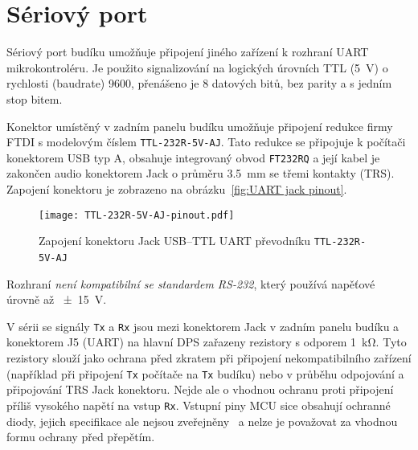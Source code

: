 \section{Sériový port}
Sériový port budíku umožňuje připojení jiného zařízení k rozhraní \acs{UART}
mikrokontroléru. Je použito signalizování na logických úrovních \acs{TTL}
(\SI{5}{\volt}) o rychlosti (\foreignlanguage{english}{baudrate})
\SI{9600}{\baud}, přenášeno je \num{8} datových bitů, bez parity a s jedním
stop bitem.

Konektor umístěný v zadním panelu budíku umožňuje připojení redukce firmy FTDI
s modelovým číslem \texttt{TTL-232R-5V-AJ}. Tato redukce se připojuje
k počítači konektorem USB typ A, obsahuje integrovaný obvod \texttt{FT232RQ}
a její kabel je zakončen audio konektorem Jack o průměru \SI{3,5}{\milli\meter}
se třemi kontakty (TRS). Zapojení konektoru je zobrazeno na
obrázku~\vref{fig:UART jack pinout}.

\begin{figure}[htbp]
    \centering
    \texttt{[image: TTL-232R-5V-AJ-pinout.pdf]}
    \caption{%
        Zapojení konektoru Jack USB--TTL UART převodníku
        \texttt{TTL-232R-5V-AJ}~\cite{TTL-232R}
    }
    \label{fig:UART jack pinout}
\end{figure}

Rozhraní \emph{není kompatibilní se standardem RS-232}, který používá napěťové
úrovně až \SI{\pm15}{\volt}.

V sérii se signály \texttt{Tx} a \texttt{Rx} jsou mezi konektorem Jack v zadním
panelu budíku a konektorem J5 (UART) na hlavní DPS zařazeny rezistory s odporem
\SI{1}{\kilo\ohm}. Tyto rezistory slouží jako ochrana před zkratem při
připojení nekompatibilního zařízení (například při připojení \texttt{Tx}
počítače na \texttt{Tx} budíku) nebo v průběhu odpojování a připojování TRS
Jack konektoru. Nejde ale o vhodnou ochranu proti připojení příliš vysokého
napětí na vstup \texttt{Rx}. Vstupní piny \acs{MCU} sice obsahují ochranné
diody, jejich specifikace ale nejsou zveřejněny~\cite{dshATmega328} a nelze je
považovat za vhodnou formu ochrany před přepětím.
